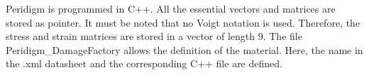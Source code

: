 % 
%               
%          
% 


Peridigm is programmed in C++. All the essential vectors and matrices are stored as pointer. It must be noted that no Voigt notation is used. Therefore, the stress and strain matrices are stored in a vector of length 9.
The file Peridigm\_DamageFactory allows the definition of the material. Here, the name in the .xml datasheet and the corresponding C++ file are defined.
